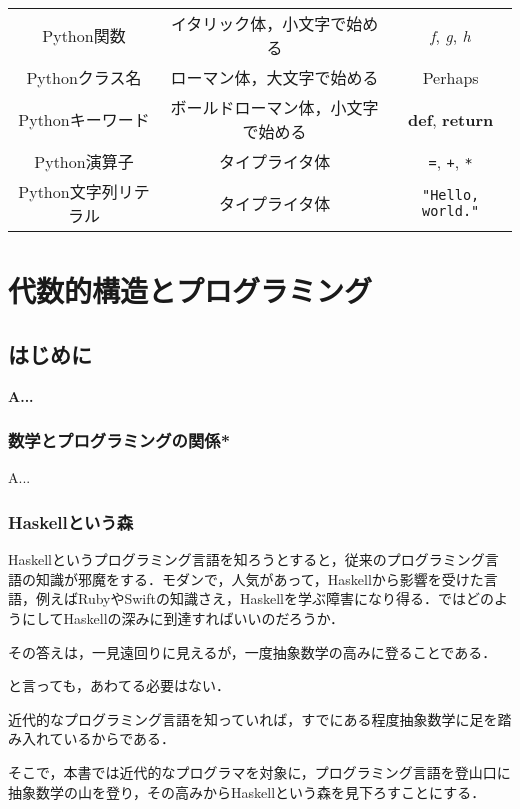 \documentclass[twocolumn]{jsbook}
\newenvironment{leader}{\begingroup\bf}{\endgroup}
\newcommand{\pthnId}[1]{\textit{#1}}
\newcommand{\pthnKeyword}[1]{\textbf{#1}}
\newcommand{\pthnOp}[1]{\texttt{#1}}
\newcommand{\pthnString}[1]{\texttt{#1}}
\begin{document}
\begin{table*}
\begin{center}
\begin{tabular}{||c|c|c||}
Python関数&イタリック体，小文字で始める&\pthnId{f}, \pthnId{g}, \pthnId{h}\\
Pythonクラス名&ローマン体，大文字で始める&Perhaps\\
Pythonキーワード&ボールドローマン体，小文字で始める&\pthnKeyword{def}, \pthnKeyword{return}\\
Python演算子&タイプライタ体&\pthnOp{=}, \pthnOp{+}, \pthnOp{*}\\
Python文字列リテラル&タイプライタ体&\pthnString{"Hello, world."}\\
\hline
\end{tabular}
\end{center}
\end{table*}

\part{代数的構造とプログラミング}

\chapter{はじめに}

\begin{leader}
A...
\end{leader}

\section{数学とプログラミングの関係*}

A...

\section{Haskellという森}

Haskellというプログラミング言語を知ろうとすると，従来のプログラミング言語の知識が邪魔をする．モダンで，人気があって，Haskellから影響を受けた言語，例えばRubyやSwiftの知識さえ，Haskellを学ぶ障害になり得る．ではどのようにしてHaskellの深みに到達すればいいのだろうか．

その答えは，一見遠回りに見えるが，一度抽象数学の高みに登ることである．

と言っても，あわてる必要はない．

近代的なプログラミング言語を知っていれば，すでにある程度抽象数学に足を踏み入れているからである．

そこで，本書では近代的なプログラマを対象に，プログラミング言語を登山口に抽象数学の山を登り，その高みからHaskellという森を見下ろすことにする．
\end{document}
